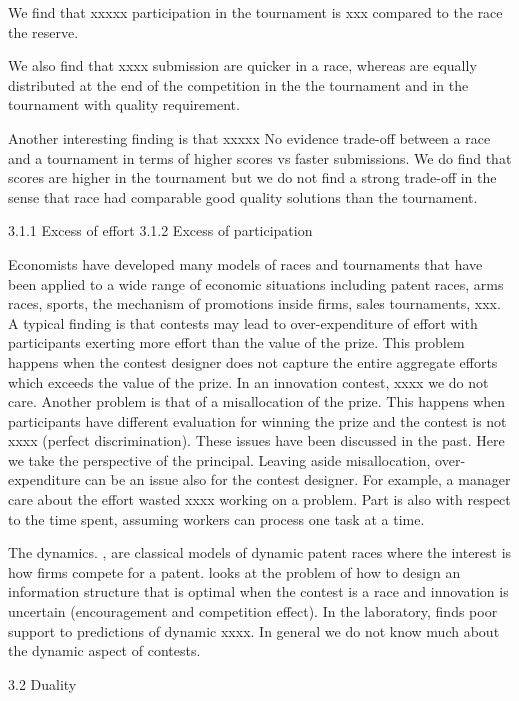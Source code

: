 \documentclass[12pt,]{article}
\begin{document}
We find that xxxxx participation in the tournament is xxx compared to
the race the reserve.

We also find that xxxx submission are quicker in a race, whereas are
equally distributed at the end of the competition in the the tournament
and in the tournament with quality requirement.

Another interesting finding is that xxxxx No evidence trade-off between
a race and a tournament in terms of higher scores vs faster submissions.
We do find that scores are higher in the tournament but we do not find a
strong trade-off in the sense that race had comparable good quality
solutions than the tournament.

3.1.1 Excess of effort 3.1.2 Excess of participation

Economists have developed many models of races and tournaments that have
been applied to a wide range of economic situations including patent
races, arms races, sports, the mechanism of promotions inside firms,
sales tournaments, xxx. A typical finding is that contests may lead to
over-expenditure of effort with participants exerting more effort than
the value of the prize. This problem happens when the contest designer
does not capture the entire aggregate efforts which exceeds the value of
the prize. In an innovation contest, xxxx we do not care. Another
problem is that of a misallocation of the prize. This happens when
participants have different evaluation for winning the prize and the
contest is not xxxx (perfect discrimination). These issues have been
discussed in the past. Here we take the perspective of the principal.
Leaving aside misallocation, over-expenditure can be an issue also for
the contest designer. For example, a manager care about the effort
wasted xxxx working on a problem. Part is also with respect to the time
spent, assuming workers can process one task at a time.

The dynamics. \citet{harris1987racing}, \citet{grossman1987dynamic} are
classical models of dynamic patent races where the interest is how firms
compete for a patent. \citet{bimpikis2014designing} looks at the problem
of how to design an information structure that is optimal when the
contest is a race and innovation is uncertain (encouragement and
competition effect). In the laboratory, \citet{zizzo2002racing} finds
poor support to predictions of dynamic xxxx. In general we do not know
much about the dynamic aspect of contests.

3.2 Duality
\end{document}
